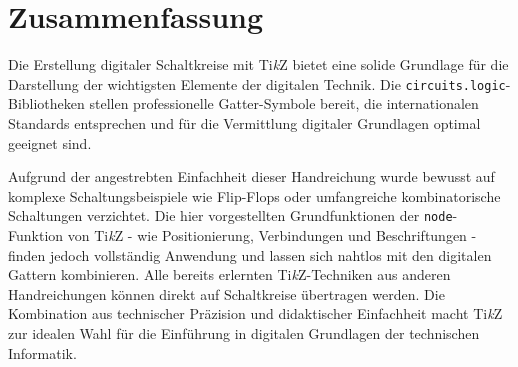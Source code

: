 \begin{ausgabe}
\begin{center}\end{center}
\end{ausgabe}

\section{Zusammenfassung}

Die Erstellung digitaler Schaltkreise mit Ti\textit{k}Z bietet eine solide Grundlage für die Darstellung der wichtigsten Elemente der digitalen Technik. Die \texttt{circuits.logic}-Bibliotheken stellen professionelle Gatter-Symbole bereit, die internationalen Standards entsprechen und für die Vermittlung digitaler Grundlagen optimal geeignet sind.

Aufgrund der angestrebten Einfachheit dieser Handreichung wurde bewusst auf komplexe Schaltungsbeispiele wie Flip-Flops oder umfangreiche kombinatorische Schaltungen verzichtet. Die hier vorgestellten Grundfunktionen der \texttt{node}-Funktion von Ti\textit{k}Z - wie Positionierung, Verbindungen und Beschriftungen - finden jedoch vollständig Anwendung und lassen sich nahtlos mit den digitalen Gattern kombinieren. Alle bereits erlernten Ti\textit{k}Z-Techniken aus anderen Handreichungen können direkt auf Schaltkreise übertragen werden. Die Kombination aus technischer Präzision und didaktischer Einfachheit macht Ti\textit{k}Z zur idealen Wahl für die Einführung in digitalen Grundlagen der technischen Informatik.

